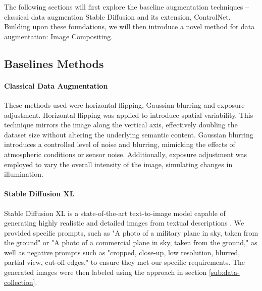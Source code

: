 The following sections will first explore the baseline augmentation techniques -- classical data augmention Stable Diffusion and its extension, ControlNet. Building upon these foundations, we will then introduce a novel method for data augmentation: Image Compositing.
\subsection{Baselines Methods}
\paragraph {Classical Data Augmentation} These methods used were horizontal flipping, Gaussian blurring and exposure adjustment. Horizontal flipping was applied to introduce spatial variability. This technique mirrors the image along the vertical axis, effectively doubling the dataset size without altering the underlying semantic content. Gaussian blurring introduces a controlled level of noise and blurring, mimicking the effects of atmospheric conditions or sensor noise. Additionally, exposure adjustment was employed to vary the overall intensity of the image, simulating changes in illumination.

\paragraph{Stable Diffusion XL}\label{subsec:sdxl}Stable Diffusion XL is a state-of-the-art text-to-image model capable of generating highly realistic and detailed images from textual descriptions \cite{sdxl}. We provided specific prompts, such as "A photo of a military plane in sky, taken from the ground" or "A photo of a commercial plane in sky, taken from the ground," as well as negative prompts such as "cropped, close-up, low resolution, blurred, partial view, cut-off edges," to ensure they met our specific requirements. The generated images were then labeled using the approach in section \ref{sub:data-collection}.

